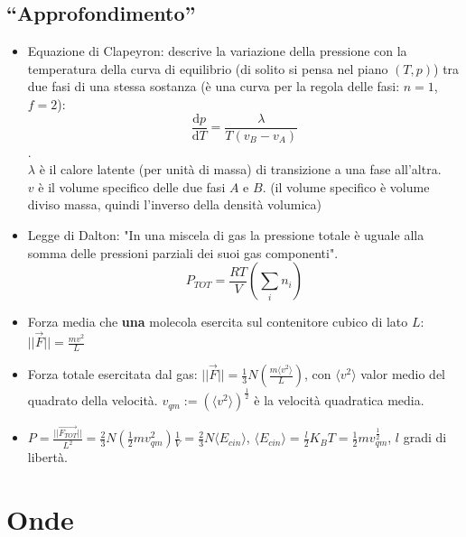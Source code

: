 \documentclass[10pt,a4paper]{article}
\newcommand{\de}{{\ensuremath{ \mbox{d}}}}
\newcommand{\norm}[1]{{\ensuremath{||{#1}||}}}
\newcommand{\ang}[1]{{\ensuremath{\langle {#1}\rangle}}}
\begin{document}
\begin{multicols}{2}
  \subsection*{``Approfondimento''}
  \begin{itemize}
  \item Equazione di Clapeyron: descrive la variazione della pressione con la temperatura della curva di equilibrio (di solito si pensa nel piano $(T,p)$) tra due fasi di una stessa sostanza (è una curva per la regola delle fasi: $n=1$, $f=2$): $$\frac{\de p}{\de T} =\frac{\lambda}{T (v_B - v_A)}$$. \\
  $\lambda$ è il calore latente (per unità di massa) di transizione a una fase all'altra. \\
  $v$ è il volume specifico delle due fasi $A$ e $B$. (il volume specifico è volume diviso massa, quindi l'inverso della densità volumica)
  \item Legge di Dalton: "In una miscela di gas la pressione totale \`e uguale alla somma delle pressioni parziali dei suoi gas componenti". $$P_{TOT} = \frac{RT}{V}\left( \sum_{i} n_i \right)$$
  \item Forza media che {\bf una} molecola esercita sul contenitore cubico di lato $L$: $\norm{\vec{F}} = \frac{mv^2}{L}$
  \item Forza totale esercitata dal gas: $\norm{\vec{F}} = \frac{1}{3}N \left(\frac{m \ang{v^2}}{L} \right)$, con $\ang{v^2}$ valor medio del quadrato della velocit\`a. $v_{qm} := (\ang{v^2})^{\frac{1}{2}}$ \`e la velocit\`a quadratica media.
  \item $P = \frac{\norm{\vec{F_{TOT}}}}{L^2} = \frac{2}{3} N \left(\frac{1}{2}m {v_{qm}^{2}} \right) \frac{1}{V} = \frac{2}{3} N \ang{E_{cin}}$, $\ang{E_{cin}} = \frac{l}{2}K_BT = \frac{1}{2}m{v_{qm}^\frac{1}{2}}$, $l$ gradi di libert\`a.
  \end{itemize}

  \section{Onde}

\end{multicols}
\end{document}
